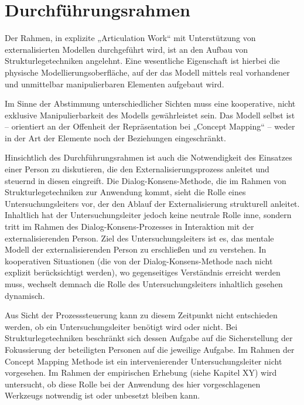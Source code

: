 \section{Durchführungsrahmen} %
\label{sec:durchführungsrahmen}

Der Rahmen, in explizite „Articulation Work“ mit Unterstützung von externalisierten Modellen durchgeführt wird, ist an den Aufbau von Strukturlegetechniken angelehnt. Eine wesentliche Eigenschaft ist hierbei die physische Modellierungsoberfläche, auf der das Modell mittels real vorhandener und unmittelbar manipulierbaren Elementen aufgebaut wird. 

Im Sinne der Abstimmung unterschiedlicher Sichten muss eine kooperative, nicht exklusive Manipulierbarkeit des Modells gewährleistet sein. Das Modell selbst ist -- orientiert an der Offenheit der Repräsentation bei „Concept Mapping“ -- weder in der Art der Elemente noch der Beziehungen eingeschränkt. 

Hinsichtlich des Durchführungsrahmen ist auch die Notwendigkeit des Einsatzes einer Person zu diskutieren, die den Externalisierungsprozess anleitet und steuernd in diesen eingreift. Die Dialog-Konsens-Methode, die im Rahmen von Strukturlegetechniken zur Anwendung kommt, sieht die Rolle eines Untersuchungsleiters vor, der den Ablauf der Externalisierung strukturell anleitet. Inhaltlich hat der Untersuchungsleiter jedoch keine neutrale Rolle inne, sondern tritt im Rahmen des Dialog-Konsens-Prozesses in Interaktion mit der externalisierenden Person. Ziel des Untersuchungsleiters ist es, das mentale Modell der externalisierenden Person zu erschließen und zu verstehen. In kooperativen Situationen (die von der Dialog-Konsens-Methode nach \citep{Scheele88} nicht explizit berücksichtigt werden), wo gegenseitiges Verständnis erreicht werden muss, wechselt demnach die Rolle des Untersuchungsleiters inhaltlich gesehen dynamisch. 

Aus Sicht der Prozesssteuerung kann zu diesem Zeitpunkt nicht entschieden werden, ob ein Untersuchungsleiter benötigt wird oder nicht. Bei Strukturlegetechniken beschränkt sich dessen Aufgabe auf die Sicherstellung der Fokussierung der beteiligten Personen auf die jeweilige Aufgabe. Im Rahmen der Concept Mapping Methode ist ein intervenierender Untersuchungsleiter nicht vorgesehen. Im Rahmen der empirischen Erhebung (siehe Kapitel XY) wird untersucht, ob diese Rolle bei der Anwendung des hier vorgeschlagenen Werkzeugs notwendig ist oder unbesetzt bleiben kann. 


